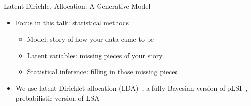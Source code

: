 \documentclass[compress]{beamer}
\begin{document}
\begin{frame}{Latent Dirichlet Allocation: A Generative Model}

\begin{itemize}
\item Focus in this talk: statistical methods
  \begin{itemize}
    \item Model: story of how your data came to be
    \item Latent variables: missing pieces of your story
    \item Statistical inference: filling in those missing pieces
  \end{itemize}
\item We use latent Dirichlet allocation (LDA)~\cite{blei-03}, a fully Bayesian
  version of pLSI~\cite{hofmann-99}, probabilistic version of
  LSA~\cite{landauer-97}
\end{itemize}

\end{frame}
\end{document}
